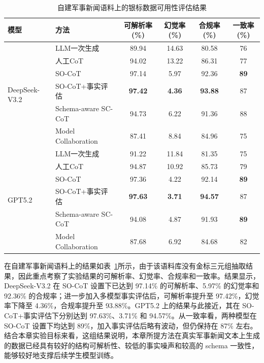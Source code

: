 \begin{table}[htbp]
  \centering
  \caption{自建军事新闻语料上的银标数据可用性评估结果}
  \label{tab:ch4_military_results}
  {\renewcommand{\arraystretch}{1.12}
  \small
  \setlength{\tabcolsep}{4pt}
  \begin{tabular}{llcccc}
    \toprule
    模型 & 方法 & 可解析率(\%) & 幻觉率(\%) & 合规率(\%) & 一致率(\%) \\
    \midrule
    \multirow{6}{*}{DeepSeek-V3.2}
    & LLM一次生成 & 89.94 & 14.63 & 80.58 & 76 \\
    & 人工CoT & 94.02 & 13.22 & 86.31 & 77 \\
    & SO-CoT & 97.14 & 5.97 & 92.36 & \textbf{89} \\
    & SO-CoT+事实评估 & \textbf{97.42} & \textbf{4.36} & \textbf{93.88} & 87 \\
    & Schema-aware SC-CoT & 94.73 & 6.22 & 91.36 & 88 \\
    & Model Collaboration & 87.41 & 8.84 & 84.96 & 75 \\
    \midrule
    \multirow{6}{*}{GPT5.2}
    & LLM一次生成 & 91.22 & 11.84 & 81.35 & 75 \\
    & 人工CoT & 94.87 & 10.92 & 85.73 & 79 \\
    & SO-CoT & 97.36 & 4.22 & 92.14 & \textbf{89} \\
    & SO-CoT+事实评估 & \textbf{97.63} & \textbf{3.71} & \textbf{94.57} & 87 \\
    & Schema-aware SC-CoT & 94.08 & 4.87 & 91.93 & \textbf{89} \\
    & Model Collaboration & 87.68 & 6.92 & 84.68 & 82 \\
    \bottomrule
  \end{tabular}}
\end{table}

在自建军事新闻语料上的结果如表~\ref{tab:ch4_military_results}所示，由于该语料库没有金标三元组抽取结果，因此重点考察了实验结果的可解析率、幻觉率、合规率和一致率。结果显示，DeepSeek-V3.2 在 SO-CoT 设置下已达到 97.14\% 的可解析率、5.97\% 的幻觉率和 92.36\% 的合规率；进一步加入多模型事实评估后，可解析率提升至 97.42\%，幻觉率下降至 4.36\%，合规率提升至 93.88\%。GPT5.2 上的结果与此接近，其在 SO-CoT+事实评估下分别达到 97.63\%、3.71\% 和 94.57\%。从一致率看，两种模型在 SO-CoT 设置下均达到 89\%，加入事实评估后略有波动，但仍保持在 87\% 左右。结合本章实验目标来看，这组结果说明，本章所提方法在真实军事新闻文本上生成的数据已经具有较好的结构可解析性、较低的事实噪声和较高的 schema 一致性，能够较好地支撑后续学生模型训练。

